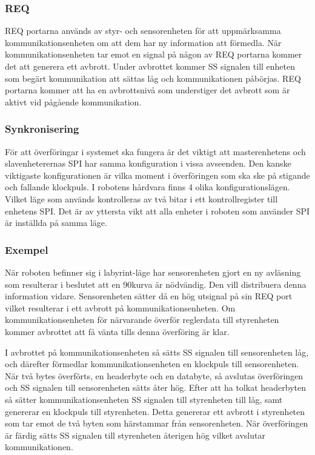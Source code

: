 \subsubsection{REQ}
REQ portarna används av styr- och sensorenheten för att uppmärksamma kommunikationsenheten om att dem har ny information att förmedla. När kommunikationsenheten tar emot en signal på någon av REQ portarna kommer det att generera ett avbrott. Under avbrottet kommer SS signalen till enheten som begärt kommunikation att sättas låg och kommunikationen påbörjas.  REQ portarna kommer att ha en avbrottsnivå som understiger det avbrott som är aktivt vid pågående kommunikation.

\subsubsection{Synkronisering}
För att överföringar i systemet ska fungera är det viktigt att masterenhetens och slavenheterernas SPI har samma konfiguration i vissa avseenden. Den kanske viktigaste konfigurationen är vilka moment i överföringen som ska ske på stigande och fallande klockpuls. I robotens hårdvara finns 4 olika konfigurationslägen. Vilket läge som används kontrolleras av två bitar i ett kontrollregister till enhetens SPI. Det är av yttersta vikt att alla enheter i roboten som använder SPI är inställda på samma läge.

\subsubsection{Exempel}

När roboten befinner sig i labyrint-läge har sensorenheten gjort en ny avläsning som resulterar i beslutet att en 90\degree kurva är nödvändig. Den vill distribuera denna information vidare. Sensorenheten sätter då en hög utsignal på sin REQ port vilket resulterar i ett avbrott på kommunikationsenheten. Om kommunikationsenheten för närvarande överför reglerdata till styrenheten kommer avbrottet att få vänta tills denna överföring är klar.

I avbrottet på kommunikationsenheten så sätts SS signalen till sensorenheten låg, och därefter förmedlar kommunikationsenheten en klockpuls till sensorenheten. När två bytes överförts, en headerbyte och en databyte, så avslutas överföringen och SS signalen till sensorenheten sätts åter hög. Efter att ha tolkat headerbyten så sätter kommunikationsenheten SS signalen till styrenheten till låg, samt genererar en klockpuls till styrenheten. Detta genererar ett avbrott i styrenheten som tar emot de två byten som härstammar från sensorenheten. När överföringen är färdig sätts SS signalen till styrenheten återigen hög vilket avslutar kommunikationen. 

